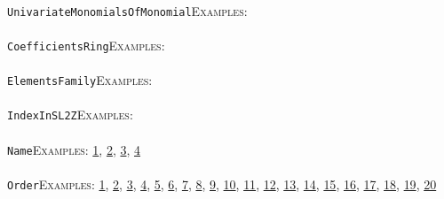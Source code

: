 \documentclass[a4paper,11pt]{report}
\begin{document}
{{ \\
 \texttt{UnivariateMonomialsOfMonomial}{\nobreakspace}{\nobreakspace}{\nobreakspace}{\nobreakspace}\textsc{Examples:} \\
 \\
 \texttt{CoefficientsRing}{\nobreakspace}{\nobreakspace}{\nobreakspace}{\nobreakspace}\textsc{Examples:} \\
 \\
 \texttt{ElementsFamily}{\nobreakspace}{\nobreakspace}{\nobreakspace}{\nobreakspace}\textsc{Examples:} \\
 \\
 \texttt{IndexInSL2Z}{\nobreakspace}{\nobreakspace}{\nobreakspace}{\nobreakspace}\textsc{Examples:} \\
 \\
 \texttt{Name}{\nobreakspace}{\nobreakspace}{\nobreakspace}{\nobreakspace}\textsc{Examples:} \href{tutorial/chap6.html} {1}{\nobreakspace}, \href{../www/SideLinks/About/aboutAbelianCategories.html} {2}{\nobreakspace}, \href{../www/SideLinks/About/aboutGraphsOfGroups.html} {3}{\nobreakspace}, \href{../www/SideLinks/About/aboutIntro.html} {4}{\nobreakspace} \\
 \\
 \texttt{Order}{\nobreakspace}{\nobreakspace}{\nobreakspace}{\nobreakspace}\textsc{Examples:} \href{tutorial/chap3.html} {1}{\nobreakspace}, \href{tutorial/chap6.html} {2}{\nobreakspace}, \href{../www/SideLinks/About/aboutAbelianCategories.html} {3}{\nobreakspace}, \href{../www/SideLinks/About/aboutNonabelian.html} {4}{\nobreakspace}, \href{../www/SideLinks/About/aboutPeriodic.html} {5}{\nobreakspace}, \href{../www/SideLinks/About/aboutCohomologyRings.html} {6}{\nobreakspace}, \href{../www/SideLinks/About/aboutPoincareSeries.html} {7}{\nobreakspace}, \href{../www/SideLinks/About/aboutCoveringSpaces.html} {8}{\nobreakspace}, \href{../www/SideLinks/About/aboutCoverinSpaces.html} {9}{\nobreakspace}, \href{../www/SideLinks/About/aboutPolytopes.html} {10}{\nobreakspace}, \href{../www/SideLinks/About/aboutQuandles.html} {11}{\nobreakspace}, \href{../www/SideLinks/About/aboutCrossedMods.html} {12}{\nobreakspace}, \href{../www/SideLinks/About/aboutquasi.html} {13}{\nobreakspace}, \href{../www/SideLinks/About/aboutSchurMultiplier.html} {14}{\nobreakspace}, \href{../www/SideLinks/About/aboutSimplicialGroups.html} {15}{\nobreakspace}, \href{../www/SideLinks/About/aboutExtensions.html} {16}{\nobreakspace}, \href{../www/SideLinks/About/aboutSpaceGroup.html} {17}{\nobreakspace}, \href{../www/SideLinks/About/aboutSuperperfect.html} {18}{\nobreakspace}, \href{../www/SideLinks/About/aboutGouter.html} {19}{\nobreakspace}, \href{../www/SideLinks/About/aboutTensorSquare.html} {20}{\nobreakspace} \\
}}
\end{document}
